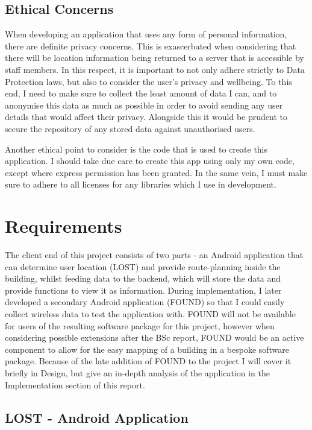 \documentclass[11pt]{informatics-report}
\begin{document}
\section{Ethical Concerns}

When developing an application that uses any form of personal information, there are definite privacy concerns. This is exascerbated when considering that there will be location information being returned to a server that is accessible by staff members. In this respect, it is important to not only adhere strictly to Data Protection laws, but also to consider the user's privacy and wellbeing. To this end, I need to make sure to collect the least amount of data I can, and to anonymise this data as much as possible in order to avoid sending any user details that would affect their privacy. Alongside this it would be prudent to secure the repository of any stored data against unauthorised users.

Another ethical point to consider is the code that is used to create this application. I should take due care to create this app using only my own code, except where express permission has been granted. In the same vein, I must make sure to adhere to all licenses for any libraries which I use in development.

\chapter{Requirements}
The client end of this project consists of two parts - an Android application that can determine user location (LOST) and provide route-planning inside the building, whilst feeding data to the backend, which will store the data and provide functions to view it as information. During implementation, I later developed a secondary Android application (FOUND) so that I could easily collect wireless data to test the application with. FOUND will not be available for users of the resulting software package for this project, however when considering possible extensions after the BSc report, FOUND would be an active component to allow for the easy mapping of a building in a bespoke software package. Because of the late addition of FOUND to the project I will cover it briefly in Design, but give an in-depth analysis of the application in the Implementation section of this report.

\section{LOST - Android Application}
\end{document}
